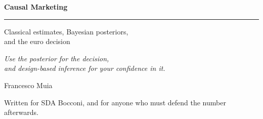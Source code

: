 %
\begin{titlepage}
\centering
{}

{\sffamily\bfseries\fontsize{34}{40}\selectfont Causal Marketing\par}

\vspace{1.2em}
{\color{SchemeDark}\rule{0.55\linewidth}{1.2pt}\par}
\vspace{1.2em}

{\sffamily\fontsize{15}{20}\selectfont
Classical estimates, Bayesian posteriors,\\ and the euro decision\par}


{\itshape\large
Use the posterior for the decision,\\
and design-based inference for your confidence in it.\par}


{\sffamily\Large Francesco Muia\par}

\vspace{1.5em}
{\small Written for SDA Bocconi, and for anyone who must defend the number afterwards.\par}

\end{titlepage}
